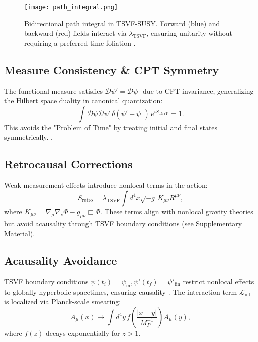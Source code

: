 \documentclass[twocolumn,superscriptaddress,floatfix]{revtex4-2}
\begin{document}
\begin{figure}[htbp]  
\centering  
\texttt{[image: path\_integral.png]}  
\caption{Bidirectional path integral in TSVF-SUSY. Forward (blue) and backward (red) fields interact via \(\lambda_{\text{TSVF}}\), ensuring unitarity without requiring a preferred time foliation \cite{Isham1992}.}  
\label{fig:path_integral}  
\end{figure}  

\subsection{Measure Consistency \& CPT Symmetry}  
\label{subsec:measure}  

The functional measure satisfies $\mathcal{D}\psi' = \mathcal{D}\psi^{\dagger}$ due to CPT invariance, generalizing the Hilbert space duality in canonical quantization:
\begin{equation}
\int \mathcal{D}\psi \mathcal{D}\psi' \, \delta(\psi' - \psi^{\dagger}) \, e^{iS_{\text{TSVF}}} = 1.
\end{equation}
This avoids the "Problem of Time" by treating initial and final states symmetrically. \cite{DeWitt1967}.  

\subsection{Retrocausal Corrections}  
\label{subsec:retrocausal}  

Weak measurement effects \cite{Aharonov2008} introduce nonlocal terms in the action:  
\begin{equation}  
S_{\text{retro}} = \lambda_{\text{TSVF}} \int d^4x\sqrt{-g} \, K_{\mu\nu}R^{\mu\nu},  
\label{eq:retro_action}  
\end{equation}  
where \( K_{\mu\nu} = \nabla_\mu\nabla_\nu\Phi - g_{\mu\nu}\Box\Phi \). These terms align with nonlocal gravity theories \cite{Barvinsky2009} but avoid acausality through TSVF boundary conditions (see Supplementary Material).  

\subsection{Acausality Avoidance}  
\label{subsec:acausality}  
TSVF boundary conditions $\psi(t_i) = \psi_{\text{in}}, \psi'(t_f) = \psi'_{\text{fin}}$ restrict nonlocal effects to globally hyperbolic spacetimes, ensuring causality \cite{Wharton2016}. The interaction term $\mathcal{L}_{\text{int}}$ is localized via Planck-scale smearing:  
\begin{equation}  
A_\mu(x) \to \int d^4y \, f\left(\frac{|x-y|}{M_P^{-1}}\right) A_\mu(y),  
\end{equation}  
where $f(z)$ decays exponentially for $z > 1$.  
\end{document}
